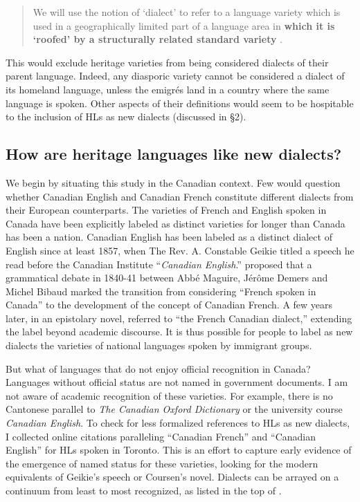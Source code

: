 \documentclass[output=paper]{LSP/langsci}
\begin{document}
\begin{quote}
We will use the notion of ‘dialect’ to refer to a language variety which is used in a geographically limited part of a language area in \textbf{which it is ‘roofed’ by a structurally related standard variety} \citep[1]{auer_study_2004}.
\end{quote}

This would exclude heritage varieties from being considered dialects of their parent language. Indeed, any diasporic variety cannot be considered a dialect of its homeland language, unless the emigrés land in a country where the same language is spoken. Other aspects of their definitions would seem to be hospitable to the inclusion of HLs as new dialects (discussed in §2). 

\subsection{How are heritage languages like new dialects?}
We begin by situating this study in the Canadian context. Few would question whether Canadian English and Canadian French constitute different dialects from their European counterparts. The varieties of French and English spoken in Canada have been explicitly labeled as distinct varieties for longer than Canada has been a nation. Canadian English has been labeled as a distinct dialect of English since at least 1857, when The Rev. A. Constable Geikie titled a speech he read before the Canadian Institute “\textit{Canadian English}.” \citet{bouchard_langue_1998} proposed that a grammatical debate in 1840-41 between Abbé Maguire, Jérôme Demers and Michel Bibaud marked the transition from considering “French spoken in Canada” to the development of the concept of Canadian French. A few years later, in an epistolary novel, \citet{coursen_it_1846} referred to “the French Canadian dialect,” extending the label beyond academic discourse. It is thus possible for people to label as new dialects the varieties of national languages spoken by immigrant groups. 

But what of languages that do not enjoy official recognition in Canada? Languages without official status are not named in government documents. I am not aware of academic recognition of these varieties. For example, there is no Cantonese parallel to \textit{The Canadian Oxford Dictionary} or the university course \textit{Canadian English}. To check for less formalized references to HLs as new dialects, I collected online citations paralleling “Canadian French” and “Canadian English” for HLs spoken in Toronto. This is an effort to capture early evidence of the emergence of named status for these varieties, looking for the modern equivalents of Geikie’s speech or Coursen’s novel. Dialects can be arrayed on a continuum from least to most recognized, as listed in the top of .
\end{document}

